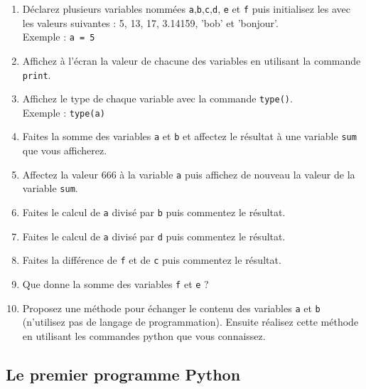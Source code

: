 \begin{enumerate}

\item        Déclarez        plusieurs        variables        nommées
  \texttt{a},\texttt{b},\texttt{c},\texttt{d},      \texttt{e}      et
  \texttt{f} puis initialisez les avec  les valeurs suivantes : 5, 13,
  17, 3.14159, 'bob' et 'bonjour'.\\ Exemple : \texttt{a = 5}


\item  Affichez  à l'écran  la  valeur  de  chacune des  variables  en
  utilisant la commande \texttt{print}.

\item  Affichez   le  type  de   chaque  variable  avec   la  commande
  \texttt{type()}.\\ Exemple : \texttt{type(a)}

\item Faites la somme des variables \texttt{a} et \texttt{b} et affectez
  le  résultat  à  une   variable  \texttt{sum}  que vous afficherez.

\item Affectez la valeur 666 à la variable \texttt{a} puis affichez de
  nouveau la valeur de la variable \texttt{sum}.

\item  Faites  le calcul  de  \texttt{a}  divisé par  \texttt{b}  puis
  commentez le résultat.

\item  Faites  le calcul  de  \texttt{a}  divisé par  \texttt{d}  puis
  commentez le résultat.

\item  Faites  la  différence  de \texttt{f}  et  de  \texttt{c}  puis
  commentez le résultat.

\item Que donne la somme des variables \texttt{f} et \texttt{e} ?

\item  Proposez une  méthode pour  échanger le  contenu des  variables
  \texttt{a}   et   \texttt{b}   (n'utilisez   pas   de   langage   de
  programmation).   Ensuite réalisez  cette méthode  en utilisant  les
  commandes python que vous connaissez.

\end{enumerate}


\subsection{Le premier programme Python}

